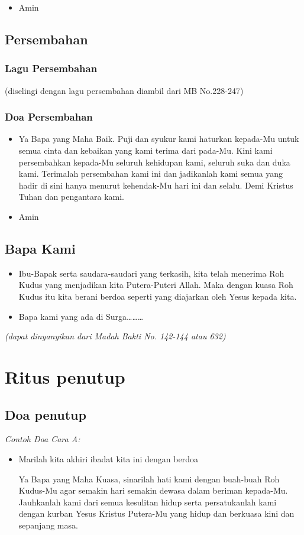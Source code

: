 \documentclass[a4paper,12pt]{article}
\newcommand{\BU}[1]{\begin{itemize} \item[U:] #1 \end{itemize}}
\newcommand{\BP}[1]{\begin{itemize} \item[P:] #1 \end{itemize}}
\newcommand{\BPU}[1]{\begin{itemize} \item[P+U:] #1 \end{itemize}}
\begin{document}
\BU{Amin}

\subsection*{Persembahan}

\subsubsection*{Lagu Persembahan}

(diselingi dengan lagu persembahan diambil dari MB No.228-247)

\subsubsection*{Doa Persembahan}

\BP{Ya Bapa yang Maha Baik. Puji dan syukur kami haturkan kepada-Mu untuk semua cinta dan kebaikan yang kami terima
dari pada-Mu. Kini kami persembahkan kepada-Mu seluruh kehidupan kami, seluruh suka dan duka kami. Terimalah
persembahan kami ini dan jadikanlah kami semua yang hadir di sini hanya menurut kehendak-Mu hari ini dan selalu. Demi
Kristus Tuhan dan pengantara kami.}

\BU{Amin}

\subsection*{Bapa Kami}

\BP{Ibu-Bapak serta saudara-saudari yang terkasih, kita telah menerima Roh Kudus yang menjadikan kita
Putera-Puteri Allah. Maka dengan kuasa Roh Kudus itu kita berani berdoa seperti yang diajarkan oleh Yesus kepada kita.}

\BPU{Bapa kami yang ada di Surga{\dots}{\dots}{\dots}}

\textit{(dapat dinyanyikan dari Madah Bakti No. 142-144 atau 632)}

\section{Ritus penutup}

\subsection*{Doa penutup}

\textit{Contoh Doa Cara A:}

\BP{Marilah kita akhiri ibadat kita ini dengan berdoa

 Ya Bapa yang Maha Kuasa, sinarilah hati kami dengan buah-buah Roh Kudus-Mu agar semakin hari semakin
dewasa dalam beriman kepada-Mu. Jauhkanlah kami dari semua kesulitan hidup serta persatukanlah
kami dengan kurban Yesus Kristus Putera-Mu yang hidup dan berkuasa kini dan sepanjang masa.}
\end{document}
